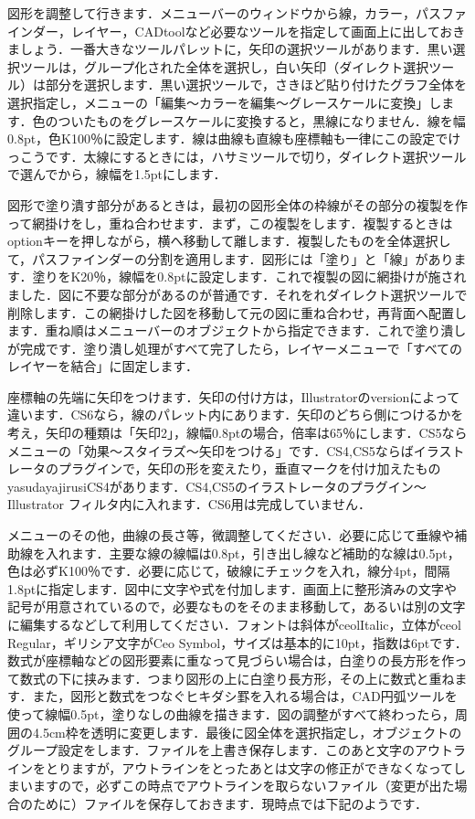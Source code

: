 \documentclass [10pt,fleqn,a4paper]{jsarticlek}
\begin{document}
図形を調整して行きます．メニューバーのウィンドウから線，カラー，パスファインダー，レイヤー，CADtoolなど必要なツールを指定して画面上に出しておきましょう．一番大きなツールパレットに，矢印の選択ツールがあります．黒い選択ツールは，グループ化された全体を選択し，白い矢印（ダイレクト選択ツール）は部分を選択します．黒い選択ツールで，さきほど貼り付けたグラフ全体を選択指定し，メニューの「編集〜カラーを編集〜グレースケールに変換」します．色のついたものをグレースケールに変換すると，黒線になりません．線を幅0.8pt，色K100％に設定します．線は曲線も直線も座標軸も一律にこの設定でけっこうです．太線にするときには，ハサミツールで切り，ダイレクト選択ツールで選んでから，線幅を1.5ptにします．

図形で塗り潰す部分があるときは，最初の図形全体の枠線がその部分の複製を作って網掛けをし，重ね合わせます．まず，この複製をします．複製するときはoptionキーを押しながら，横へ移動して離します．複製したものを全体選択して，パスファインダーの分割を適用します．図形には「塗り」と「線」があります．塗りをK20％，線幅を0.8ptに設定します．これで複製の図に網掛けが施されました．図に不要な部分があるのが普通です．それをれダイレクト選択ツールで削除します．この網掛けした図を移動して元の図に重ね合わせ，再背面へ配置します．重ね順はメニューバーのオブジェクトから指定できます．これで塗り潰しが完成です．塗り潰し処理がすべて完了したら，レイヤーメニューで「すべてのレイヤーを結合」に固定します．

座標軸の先端に矢印をつけます．矢印の付け方は，Illustratorのversionによって違います．CS6なら，線のパレット内にあります．矢印のどちら側につけるかを考え，矢印の種類は「矢印2」，線幅0.8ptの場合，倍率は65％にします．CS5ならメニューの「効果〜スタイラズ〜矢印をつける」です．CS4,CS5ならばイラストレータのプラグインで，矢印の形を変えたり，垂直マークを付け加えたものyasudayajirusiCS4があります．CS4,CS5のイラストレータのプラグイン〜Illustrator フィルタ内に入れます．CS6用は完成していません．

メニューのその他，曲線の長さ等，微調整してください．必要に応じて垂線や補助線を入れます．主要な線の線幅は0.8pt，引き出し線など補助的な線は0.5pt，色は必ずK100％です．必要に応じて，破線にチェックを入れ，線分4pt，間隔1.8ptに指定します．図中に文字や式を付加します．画面上に整形済みの文字や記号が用意されているので，必要なものをそのまま移動して，あるいは別の文字に編集するなどして利用してください．フォントは斜体がceolItalic，立体がceol Regular，ギリシア文字がCeo Symbol，サイズは基本的に10pt，指数は6ptです．数式が座標軸などの図形要素に重なって見づらい場合は，白塗りの長方形を作って数式の下に挟みます．つまり図形の上に白塗り長方形，その上に数式と重ねます．また，図形と数式をつなぐヒキダシ罫を入れる場合は，CAD円弧ツールを使って線幅0.5pt，塗りなしの曲線を描きます．図の調整がすべて終わったら，周囲の4.5cm枠を透明に変更します．最後に図全体を選択指定し，オブジェクトのグループ設定をします．ファイルを上書き保存します．このあと文字のアウトラインをとりますが，アウトラインをとったあとは文字の修正ができなくなってしまいますので，必ずこの時点でアウトラインを取らないファイル（変更が出た場合のために）ファイルを保存しておきます．現時点では下記のようです．
\end{document}
